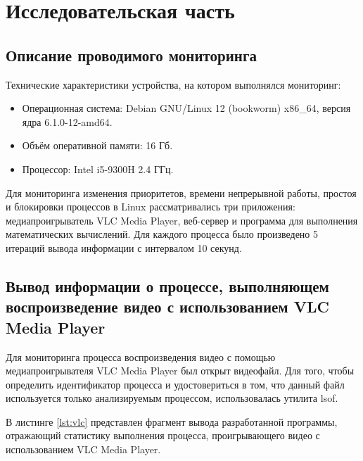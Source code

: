 \chapter{Исследовательская часть}

\section{Описание проводимого мониторинга}

Технические характеристики устройства, на котором выполнялся мониторинг:

\begin{itemize}[label*=---]
	\item Операционная система: Debian GNU/Linux 12 (bookworm) x86\_64, версия ядра 6.1.0-12-amd64.
	\item Объём оперативной памяти: 16 Гб.
	\item Процессор: Intel i5-9300H 2.4 ГГц.
\end{itemize}

Для мониторинга изменения приоритетов, времени непрерывной работы, простоя и блокировки процессов в Linux рассматривались три приложения: медиапроигрыватель VLC Media Player, веб-сервер и программа для выполнения математических вычислений. Для каждого процесса было произведено 5 итераций вывода информации с интервалом 10 секунд.

\section{Вывод информации о процессе, выполняющем воспроизведение видео с использованием VLC Media Player}

Для мониторинга процесса воспроизведения видео с помощью медиапроигрывателя VLC Media Player был открыт видеофайл. Для того, чтобы определить идентификатор процесса и удостовериться в том, что данный файл используется только анализируемым процессом, использовалась утилита lsof.

В листинге \ref{lst:vlc} представлен фрагмент вывода разработанной программы, отражающий статистику выполнения процесса, проигрывающего видео с использованием VLC Media Player.

